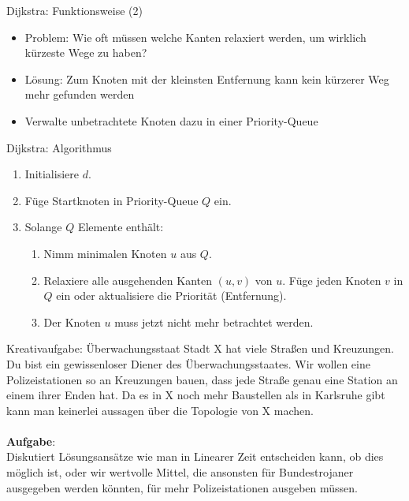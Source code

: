 \begin{frame}{Dijkstra: Funktionsweise (2)}
	\begin{itemize}
		\item Problem: Wie oft müssen welche Kanten relaxiert werden, um wirklich kürzeste Wege zu haben?
		\item Lösung: Zum Knoten mit der kleinsten Entfernung kann kein kürzerer Weg mehr gefunden werden
		\item Verwalte unbetrachtete Knoten dazu in einer Priority-Queue
	\end{itemize}
\end{frame}

\begin{frame}{Dijkstra: Algorithmus}
	\begin{enumerate}
		\item Initialisiere $d$.
		\item Füge Startknoten in Priority-Queue $Q$ ein.
		\item Solange $Q$ Elemente enthält:
			\begin{enumerate}
				\item Nimm minimalen Knoten $u$ aus $Q$.
				\item Relaxiere alle ausgehenden Kanten $(u, v)$ von $u$. Füge jeden Knoten $v$ in $Q$ ein oder aktualisiere die Priorität (Entfernung).
				\item Der Knoten $u$ muss jetzt nicht mehr betrachtet werden.
			\end{enumerate}
	\end{enumerate}
\end{frame}

\begin{frame}{Kreativaufgabe: Überwachungsstaat}
	Stadt X hat viele Straßen und Kreuzungen. Du bist ein gewissenloser Diener des Überwachungsstaates. Wir wollen eine Polizeistationen so an Kreuzungen bauen, dass jede Straße genau eine Station an einem ihrer Enden hat. Da es in X noch mehr Baustellen als in Karlsruhe gibt kann man keinerlei aussagen über die Topologie von X machen. \\ \ \\

	\textbf{Aufgabe}:\\ Diskutiert Lösungsansätze wie man in Linearer Zeit entscheiden kann, ob dies möglich ist, oder wir wertvolle Mittel, die ansonsten für Bundestrojaner ausgegeben werden könnten, für mehr Polizeistationen ausgeben müssen.
\end{frame}

